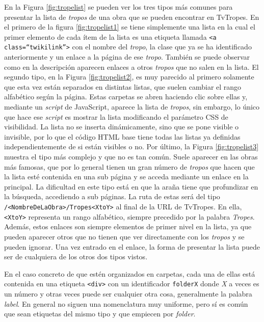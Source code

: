 En la Figura \ref{fig:tropelist} se pueden ver los tres tipos más comunes para
presentar la lista de \textit{tropos} de una obra que se pueden encontrar en
TvTropes. En el primero de la figura \ref{fig:tropelist1} se tiene simplemente
una lista en la cual el primer elemento de cada ítem de la lista es una etiqueta
llamada \texttt{<a class=``twikilink''>} con el nombre del \textit{tropo}, la
clase que ya se ha identificado anteriormente y un enlace a la página de ese
\textit{tropo}. También se puede observar como en la descripción aparecen
enlaces a otros \textit{tropos} que no salen en la lista. El segundo tipo, en la
Figura \ref{fig:tropelist2}, es muy parecido al primero solamente que esta vez
están separados en distintas listas, que suelen cambiar el rango alfabético
según la página. Estas carpetas se abren haciendo clic sobre ellas y, mediante
un \textit{script} de JavaScript, aparece la lista de \textit{tropos}, sin
embargo, lo único que hace ese \textit{script} es mostrar la lista modificando
el parámetro CSS de visibilidad. La lista no se inserta dinámicamente, sino que
se pone visible o invisible, por lo que el código HTML base tiene todas las
listas ya definidas independientemente de si están visibles o no. Por último, la
Figura \ref{fig:tropelist3} muestra el tipo más complejo y que no es tan común.
Suele aparecer en las obras más famosas, que por lo general tienen un gran
número de \textit{tropos} que hacen que la lista esté contenida en una sub
página y se acceda mediante un enlace en la principal. La dificultad en este
tipo está en que la araña tiene que profundizar en la búsqueda, accediendo a sub
páginas. La ruta de estas será del tipo \texttt{/<NombreDeLaObra>/Tropes<XtoY>}
al final de la URL de TvTropes. En ella, \texttt{<XtoY>} representa un rango
alfabético, siempre precedido por la palabra \textit{Tropes}. Además, estos
enlaces son siempre elementos de primer nivel en la lista, ya que pueden
aparecer otros que no tienen que ver directamente con los \textit{tropos} y se
pueden ignorar. Una vez entrado en el enlace, la forma de presentar la lista
puede ser de cualquiera de los otros dos tipos vistos.

En el caso concreto de que estén organizados en carpetas, cada una de ellas está
contenida en una etiqueta \texttt{<div>} con un identificador \texttt{folderX}
donde \textit{X} a veces es un número y otras veces puede ser cualquier otra
cosa, generalmente la palabra \textit{label}. En general no siguen una
nomenclatura muy uniforme, pero sí es común que sean etiquetas del mismo tipo y
que empiecen por \textit{folder}. 

